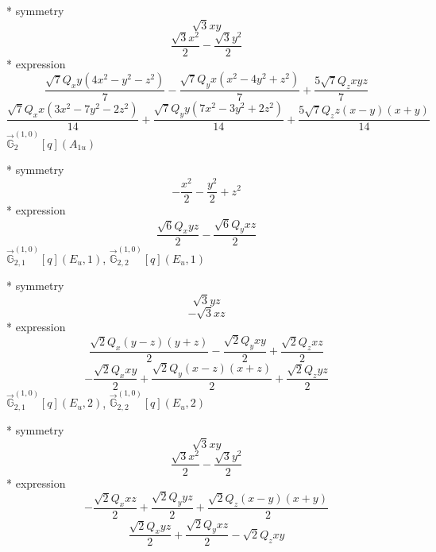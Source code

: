 \documentclass[fleqn,8pt]{jsarticle}
\begin{document}
\noindent\quad ** symmetry
\begin{dmath*}
\sqrt{3} x y
\end{dmath*}
\begin{dmath*}
\frac{\sqrt{3} x^{2}}{2} - \frac{\sqrt{3} y^{2}}{2}
\end{dmath*}
\noindent\quad ** expression
\begin{dmath*}
\frac{\sqrt{7} Q_{x} y \left(4 x^{2} - y^{2} - z^{2}\right)}{7} - \frac{\sqrt{7} Q_{y} x \left(x^{2} - 4 y^{2} + z^{2}\right)}{7} + \frac{5 \sqrt{7} Q_{z} x y z}{7}
\end{dmath*}
\begin{dmath*}
\frac{\sqrt{7} Q_{x} x \left(3 x^{2} - 7 y^{2} - 2 z^{2}\right)}{14} + \frac{\sqrt{7} Q_{y} y \left(7 x^{2} - 3 y^{2} + 2 z^{2}\right)}{14} + \frac{5 \sqrt{7} Q_{z} z \left(x - y\right) \left(x + y\right)}{14}
\end{dmath*}
\noindent\quad $\vec{\mathbb{G}}_{2}^{(1,0)}[q](A_{1u})$

\noindent\quad ** symmetry
\begin{dmath*}
- \frac{x^{2}}{2} - \frac{y^{2}}{2} + z^{2}
\end{dmath*}
\noindent\quad ** expression
\begin{dmath*}
\frac{\sqrt{6} Q_{x} y z}{2} - \frac{\sqrt{6} Q_{y} x z}{2}
\end{dmath*}
\noindent\quad $\vec{\mathbb{G}}_{2,1}^{(1,0)}[q](E_{u},1)$, $\vec{\mathbb{G}}_{2,2}^{(1,0)}[q](E_{u},1)$

\noindent\quad ** symmetry
\begin{dmath*}
\sqrt{3} y z
\end{dmath*}
\begin{dmath*}
- \sqrt{3} x z
\end{dmath*}
\noindent\quad ** expression
\begin{dmath*}
\frac{\sqrt{2} Q_{x} \left(y - z\right) \left(y + z\right)}{2} - \frac{\sqrt{2} Q_{y} x y}{2} + \frac{\sqrt{2} Q_{z} x z}{2}
\end{dmath*}
\begin{dmath*}
- \frac{\sqrt{2} Q_{x} x y}{2} + \frac{\sqrt{2} Q_{y} \left(x - z\right) \left(x + z\right)}{2} + \frac{\sqrt{2} Q_{z} y z}{2}
\end{dmath*}
\noindent\quad $\vec{\mathbb{G}}_{2,1}^{(1,0)}[q](E_{u},2)$, $\vec{\mathbb{G}}_{2,2}^{(1,0)}[q](E_{u},2)$

\noindent\quad ** symmetry
\begin{dmath*}
\sqrt{3} x y
\end{dmath*}
\begin{dmath*}
\frac{\sqrt{3} x^{2}}{2} - \frac{\sqrt{3} y^{2}}{2}
\end{dmath*}
\noindent\quad ** expression
\begin{dmath*}
- \frac{\sqrt{2} Q_{x} x z}{2} + \frac{\sqrt{2} Q_{y} y z}{2} + \frac{\sqrt{2} Q_{z} \left(x - y\right) \left(x + y\right)}{2}
\end{dmath*}
\begin{dmath*}
\frac{\sqrt{2} Q_{x} y z}{2} + \frac{\sqrt{2} Q_{y} x z}{2} - \sqrt{2} Q_{z} x y
\end{dmath*}
\end{document}
